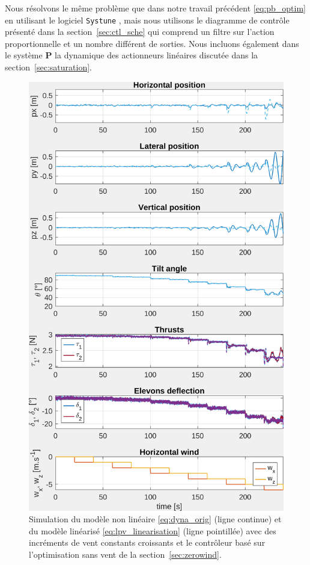 Nous résolvons le même problème que dans notre travail précédent \ref{eq:pb_optim} en utilisant le logiciel {\tt Systune} \cite{1576856}, mais nous utilisons le diagramme de contrôle présenté dans la section~\ref{sec:ctl_sche} qui comprend un filtre sur l'action proportionnelle et un nombre différent de sorties. Nous incluons également dans le système $\boldsymbol{P}$ la dynamique des actionneurs linéaires discutée dans la section~\ref{sec:saturation}.
\begin{figure}[ht!]
    \centering
    \includegraphics[trim=0cm 0cm 0cm 0cm,clip,width=0.6\columnwidth]{figures/sim_systune_zero_wind.png}
    \caption{Simulation du modèle non linéaire \eqref{eq:dyna_orig} (ligne continue) et du modèle linéarisé \eqref{eq:lpv_linearisation} (ligne pointillée) avec des incréments de vent constants croissants et le contrôleur basé sur l'optimisation sans vent de la section~\ref{sec:zerowind}.}
    \label{fig:SimSytuneStruct_zero}
\end{figure}

